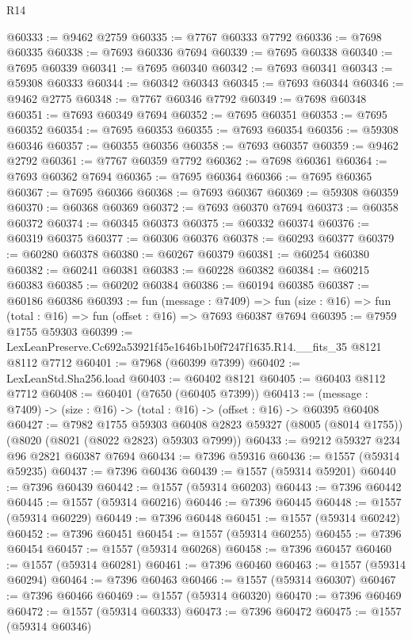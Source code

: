 \begin{lexlean}{R14}
\begin{coremodule}
@60333 := @9462 @2759
@60335 := @7767 @60333 @7792
@60336 := @7698 @60335
@60338 := @7693 @60336 @7694
@60339 := @7695 @60338
@60340 := @7695 @60339
@60341 := @7695 @60340
@60342 := @7693 @60341
@60343 := @59308 @60333
@60344 := @60342 @60343
@60345 := @7693 @60344
@60346 := @9462 @2775
@60348 := @7767 @60346 @7792
@60349 := @7698 @60348
@60351 := @7693 @60349 @7694
@60352 := @7695 @60351
@60353 := @7695 @60352
@60354 := @7695 @60353
@60355 := @7693 @60354
@60356 := @59308 @60346
@60357 := @60355 @60356
@60358 := @7693 @60357
@60359 := @9462 @2792
@60361 := @7767 @60359 @7792
@60362 := @7698 @60361
@60364 := @7693 @60362 @7694
@60365 := @7695 @60364
@60366 := @7695 @60365
@60367 := @7695 @60366
@60368 := @7693 @60367
@60369 := @59308 @60359
@60370 := @60368 @60369
@60372 := @7693 @60370 @7694
@60373 := @60358 @60372
@60374 := @60345 @60373
@60375 := @60332 @60374
@60376 := @60319 @60375
@60377 := @60306 @60376
@60378 := @60293 @60377
@60379 := @60280 @60378
@60380 := @60267 @60379
@60381 := @60254 @60380
@60382 := @60241 @60381
@60383 := @60228 @60382
@60384 := @60215 @60383
@60385 := @60202 @60384
@60386 := @60194 @60385
@60387 := @60186 @60386
@60393 := fun (message : @7409) =>
  fun (size : @16) => fun (total : @16) => fun (offset : @16) => @7693 @60387 @7694
@60395 := @7959 @1755 @59303
@60399 := LexLeanPreserve.Cc692a53921f45e1646b1b0f7247f1635.R14.__fits_35 @8121 @8112 @7712
@60401 := @7968 (@60399 @7399)
@60402 := LexLeanStd.Sha256.load
@60403 := @60402 @8121
@60405 := @60403 @8112 @7712
@60408 := @60401 (@7650 (@60405 @7399))
@60413 := (message : @7409) -> (size : @16) -> (total : @16) -> (offset : @16) -> @60395 @60408
@60427 := @7982
    @1755
    @59303
    @60408
    @2823
    @59327
    (@8005 (@8014 @1755))
    (@8020 (@8021 (@8022 @2823) @59303 @7999))
@60433 := @9212 @59327 @234 @96 @2821 @60387 @7694
@60434 := @7396 @59316
@60436 := @1557 (@59314 @59235)
@60437 := @7396 @60436
@60439 := @1557 (@59314 @59201)
@60440 := @7396 @60439
@60442 := @1557 (@59314 @60203)
@60443 := @7396 @60442
@60445 := @1557 (@59314 @60216)
@60446 := @7396 @60445
@60448 := @1557 (@59314 @60229)
@60449 := @7396 @60448
@60451 := @1557 (@59314 @60242)
@60452 := @7396 @60451
@60454 := @1557 (@59314 @60255)
@60455 := @7396 @60454
@60457 := @1557 (@59314 @60268)
@60458 := @7396 @60457
@60460 := @1557 (@59314 @60281)
@60461 := @7396 @60460
@60463 := @1557 (@59314 @60294)
@60464 := @7396 @60463
@60466 := @1557 (@59314 @60307)
@60467 := @7396 @60466
@60469 := @1557 (@59314 @60320)
@60470 := @7396 @60469
@60472 := @1557 (@59314 @60333)
@60473 := @7396 @60472
@60475 := @1557 (@59314 @60346)

\end{coremodule}
\end{lexlean}
